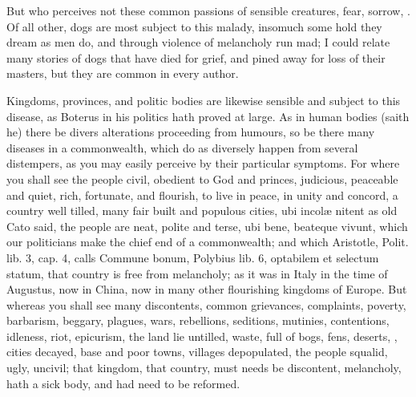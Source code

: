 {But who perceives not these common passions of sensible creatures,
fear, sorrow, \etc{}. Of all other, dogs are most subject to this malady,
insomuch some hold they dream as men do, and through violence of
melancholy run mad; I could relate many stories of dogs that have died
for grief, and pined away for loss of their masters, but they are
common in every author.

Kingdoms, provinces, and politic bodies are likewise sensible and
subject to this disease, as Boterus in his politics hath proved at
large. As in human bodies (saith he) there be divers alterations
proceeding from humours, so be there many diseases in a commonwealth,
which do as diversely happen from several distempers, as you may easily
perceive by their particular symptoms. For where you shall see the
people civil, obedient to God and princes, judicious, peaceable and
quiet, rich, fortunate, and flourish, to live in peace, in unity
and concord, a country well tilled, many fair built and populous
cities, ubi incol\ae{} nitent as old Cato said, the people are neat,
polite and terse, ubi bene, beateque vivunt, which our politicians make
the chief end of a commonwealth; and which  Aristotle, Polit. lib.
3, cap. 4, calls Commune bonum, Polybius lib. 6, optabilem et selectum
statum, that country is free from melancholy; as it was in Italy in the
time of Augustus, now in China, now in many other flourishing kingdoms
of Europe. But whereas you shall see many discontents, common
grievances, complaints, poverty, barbarism, beggary, plagues, wars,
rebellions, seditions, mutinies, contentions, idleness, riot,
epicurism, the land lie untilled, waste, full of bogs, fens, deserts,
\etc{}, cities decayed, base and poor towns, villages depopulated, the
people squalid, ugly, uncivil; that kingdom, that country, must needs
be discontent, melancholy, hath a sick body, and had need to be
reformed.

}

